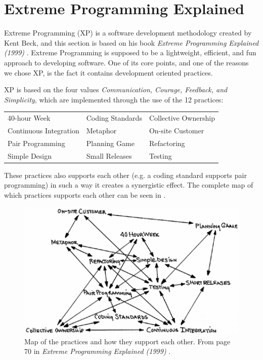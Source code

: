 \section{Extreme Programming Explained}
Extreme Programming (XP) is a software development methodology created by Kent Beck, and this section is based on his book \textit{Extreme Programming Explained (1999)} \citep{xp:explained}. 
Extreme Programming is supposed to be a lightweight, efficient, and fun approach to developing software.
One of its core points, and one of the reasons we chose XP, is the fact it contains development oriented practices.

\noindent XP is based on the four values \textit{Communication, Courage, Feedback, and Simplicity}, which are implemented through the use of the 12 practices:

\begin{tabularx}{\textwidth}{X X X}
	40-hour Week				 & Coding Standards & Collective Ownership \\
	Continuous Integration	  & Metaphor         	 & On-site Customer     \\
	Pair Programming			& Planning Game		& Refactoring          \\
	Simple Design          		  & Small Releases   	& Testing             
\end{tabularx}

These practices also supports each other (e.g. a coding standard supports pair programming) in such a way it creates a synergistic effect.
The complete map of which practices supports each other can be seen in .
\begin{figure}[H]
	\centering
	\includegraphics[]{Images/xpPracticeSupport.png}
		\caption{Map of the practices and how they support each other.
			From page 70 in \textit{Extreme Programming Explained (1999)} \citep{xp:explained}. }
	\label{fig:practiceSupport}
\end{figure}

